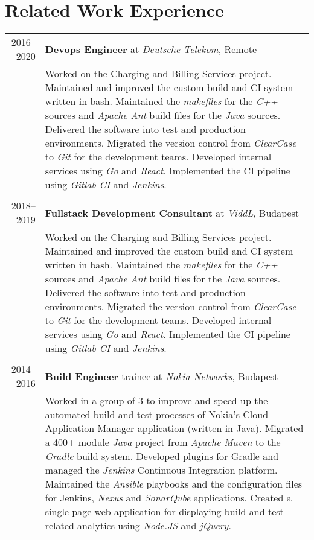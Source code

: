 \documentclass[a4paper,10pt]{article} %
\begin{document}
\section{Related Work Experience}
\begin{tabular}{r|p{12.5cm}}
\textsc{2016--2020} & \textbf{Devops Engineer} at \emph{Deutsche Telekom}, Remote \\
& \footnotesize{Worked on the Charging and Billing Services project. Maintained and improved the custom build and CI system written in bash. Maintained the \emph{makefiles} for the \emph{C++} sources and \emph{Apache Ant} build files for the \emph{Java} sources. Delivered the software into test and production environments. Migrated the version control from \emph{ClearCase} to \emph{Git} for the development teams}. Developed internal services using \emph{Go} and \emph{React}. Implemented the CI pipeline using \emph{Gitlab CI} and \emph{Jenkins}.\\

\multicolumn{2}{c}{} \\
\textsc{2018--2019} & \textbf{Fullstack Development Consultant} at \emph{ViddL}, Budapest \\
& \footnotesize{Worked on the Charging and Billing Services project. Maintained and improved the custom build and CI system written in bash. Maintained the \emph{makefiles} for the \emph{C++} sources and \emph{Apache Ant} build files for the \emph{Java} sources. Delivered the software into test and production environments. Migrated the version control from \emph{ClearCase} to \emph{Git} for the development teams}. Developed internal services using \emph{Go} and \emph{React}. Implemented the CI pipeline using \emph{Gitlab CI} and \emph{Jenkins}.\\

\multicolumn{2}{c}{} \\

\textsc{2014--2016} & \textbf{Build Engineer} trainee at \emph{Nokia Networks}, Budapest \\
& \footnotesize{Worked in a group of 3 to improve and speed up the automated build and test processes of Nokia’s Cloud Application Manager application (written in Java).
Migrated a 400+ module \emph{Java} project from \emph{Apache Maven} to the \emph{Gradle} build system. Developed plugins for Gradle and managed the \emph{Jenkins} Continuous Integration platform. Maintained the \emph{Ansible} playbooks and the configuration files for Jenkins, \emph{Nexus} and \emph{SonarQube} applications. Created a single page web-application for displaying build and test related analytics using \emph{Node.JS} and \emph{jQuery}.}\\

\end{tabular}
\end{document}
